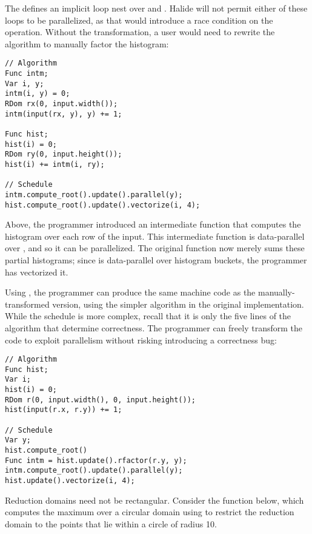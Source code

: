 The  defines an implicit loop nest over  and . Halide will not permit either of these loops to be parallelized, as that would introduce a race condition on the \code{+=} operation. Without the  transformation, a user would need to rewrite the algorithm to manually factor the histogram:

\noindent
\begin{minipage}{\linewidth}
\begin{lstlisting}
// Algorithm
Func intm;
Var i, y;
intm(i, y) = 0;
RDom rx(0, input.width());
intm(input(rx, y), y) += 1;

Func hist;
hist(i) = 0;
RDom ry(0, input.height());
hist(i) += intm(i, ry);

// Schedule
intm.compute_root().update().parallel(y);
hist.compute_root().update().vectorize(i, 4);
\end{lstlisting}
\end{minipage}

Above, the programmer introduced an intermediate function  that computes the histogram over each row of the input. This intermediate function is data-parallel over , and so it can be parallelized. The original function  now merely sums these partial histograms; since  is data-parallel over histogram buckets, the programmer has vectorized it.

Using , the programmer can produce the same machine code as the manually-transformed version, using the simpler algorithm in the original  implementation. While the schedule is more complex, recall that it is only the five lines of the algorithm that determine correctness. The programmer can freely transform the code to exploit parallelism without risking introducing a correctness bug:

\noindent
\begin{minipage}{\linewidth}
\begin{lstlisting}
// Algorithm
Func hist;
Var i;
hist(i) = 0;
RDom r(0, input.width(), 0, input.height());
hist(input(r.x, r.y)) += 1;

// Schedule
Var y;
hist.compute_root()
Func intm = hist.update().rfactor(r.y, y);
intm.compute_root().update().parallel(y);
hist.update().vectorize(i, 4);
\end{lstlisting}
\end{minipage}

Reduction domains need not be rectangular. Consider the function below, which computes the maximum over a circular domain using  to restrict the reduction domain to the points that lie within a circle of radius 10.

